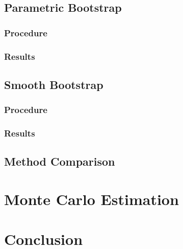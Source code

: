 \documentclass[12pt]{article}
\begin{document}
\subsection{Parametric Bootstrap}
\subsubsection*{Procedure}
\subsubsection*{Results}

\subsection{Smooth Bootstrap}
\subsubsection*{Procedure}
\subsubsection*{Results}

\subsection{Method Comparison}


\newpage
\section{Monte Carlo Estimation}

\newpage
\section{Conclusion}


 
\end{document}
